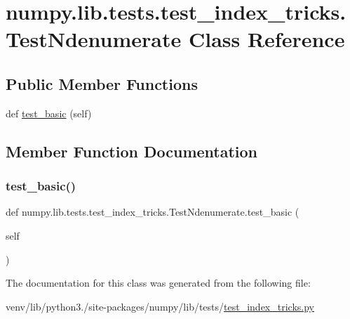 \hypertarget{classnumpy_1_1lib_1_1tests_1_1test__index__tricks_1_1TestNdenumerate}{}\section{numpy.\+lib.\+tests.\+test\+\_\+index\+\_\+tricks.\+Test\+Ndenumerate Class Reference}
\label{classnumpy_1_1lib_1_1tests_1_1test__index__tricks_1_1TestNdenumerate}
\subsection*{Public Member Functions}
\begin{DoxyCompactItemize}
\item 
def \hyperlink{classnumpy_1_1lib_1_1tests_1_1test__index__tricks_1_1TestNdenumerate_a24bc2ab3e4ce2e05f1174a19eaca3fce}{test\+\_\+basic} (self)
\end{DoxyCompactItemize}


\subsection{Member Function Documentation}
\mbox{\label{classnumpy_1_1lib_1_1tests_1_1test__index__tricks_1_1TestNdenumerate_a24bc2ab3e4ce2e05f1174a19eaca3fce}} 
\subsubsection{\texorpdfstring{test\+\_\+basic()}{test\_basic()}}
{\footnotesize\ttfamily def numpy.\+lib.\+tests.\+test\+\_\+index\+\_\+tricks.\+Test\+Ndenumerate.\+test\+\_\+basic (\begin{DoxyParamCaption}\item[{}]{self }\end{DoxyParamCaption})}



The documentation for this class was generated from the following file\+:\begin{DoxyCompactItemize}
\item 
venv/lib/python3./site-\/packages/numpy/lib/tests/\hyperlink{test__index__tricks_8py}{test\+\_\+index\+\_\+tricks.\+py}\end{DoxyCompactItemize}
